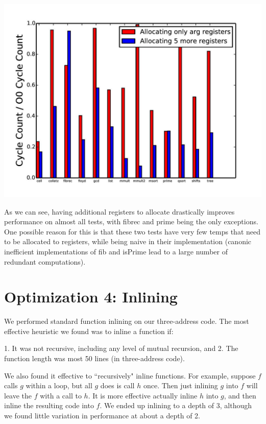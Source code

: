 \documentclass{article}
\begin{document}
\includegraphics[scale=0.5]{allocating_more_regs-page-001}

As we can see, having additional registers to allocate drastically improves performance on almost all tests, with fibrec and prime being the only exceptions. One possible reason for this is that these two tests have very few temps that need to be allocated to registers, while being naive in their implementation (canonic inefficient implementations of fib and isPrime lead to a large number of redundant computations). 

\section{Optimization 4: Inlining}

We performed standard function inlining on our three-address code. The most effective heuristic we found was to inline a function if:

1. It was not recursive, including any level of mutual recursion, and
2. The function length was most 50 lines (in three-address code).

We also found it effective to ``recursively" inline functions. For example, suppose $f$ calls $g$ within a loop, but all $g$ does is call $h$ once. Then just inlining $g$ into $f$ will leave the $f$ with a call to $h$. It is more effective actually inline $h$ into $g$, and then inline the resulting code into $f$. We ended up inlining to a depth of 3, although we found little variation in performance at about a depth of 2.
\end{document}
